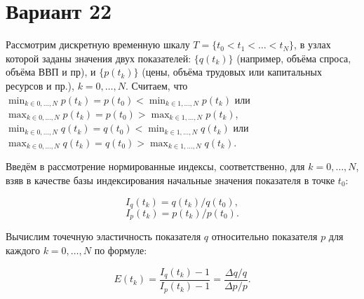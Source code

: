 \documentclass{article}
\begin{document}
\section*{Вариант 22}

Рассмотрим дискретную временную шкалу \(T = \{t_0 < t_1 < \dots < t_N\}\), в узлах которой заданы значения двух показателей: \(\{q(t_k)\}\) (например, объёма спроса, объёма ВВП и пр), и \(\{p(t_k)\}\) (цены, объёма трудовых или капитальных ресурсов и пр.), \(k = 0, \dots, N\). Считаем, что \(\displaystyle \min_{k \in 0,\dots,N} p(t_k) = p(t_0) < \min_{k \in 1,\dots,N} p(t_k)\) или \(\displaystyle \max_{k \in 0,\dots,N} p(t_k) = p(t_0) > \max_{k \in 1,\dots,N} p(t_k)\), \(\displaystyle \min_{k \in 0,\dots,N} q(t_k) = q(t_0) < \min_{k \in 1,\dots,N} q(t_k)\) или \(\displaystyle \max_{k \in 0,\dots,N} q(t_k) = q(t_0) > \max_{k \in 1,\dots,N} q(t_k)\).

Введём в рассмотрение нормированные индексы, соответственно, для \(k = 0, \dots, N\), взяв в качестве базы индексирования начальные значения показателя в точке \(t_0\):

\begin{equation}
I_q(t_k) = q(t_k)/q(t_0), \tag{1}
\end{equation}
\begin{equation}
I_p(t_k) = p(t_k)/p(t_0). \tag{2}
\end{equation}

Вычислим точечную эластичность показателя \(q\) относительно показателя \(p\) для каждого \(k = 0, \dots, N\) по формуле:

\begin{equation}
E(t_k) = \frac{I_q(t_k) - 1}{I_p(t_k) - 1} = \frac{\Delta q/q}{\Delta p/p}. \tag{3}
\end{equation}
\end{document}
